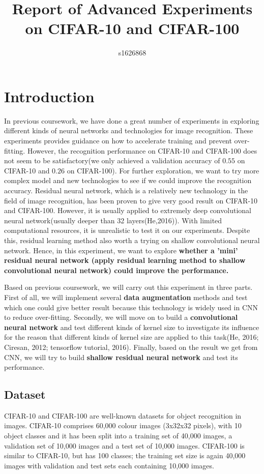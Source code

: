 \documentclass[]{article}
\begin{document}
\title{Report of Advanced Experiments on CIFAR-10 and CIFAR-100}
\author{s1626868}
\maketitle

\section{Introduction}
In previous coursework, we have done a great number of experiments in exploring different kinds of neural networks and technologies for image recognition. These experiments provides guidance on how to accelerate training and prevent over-fitting. However, the recognition performance on CIFAR-10 and CIFAR-100 does not seem to be satisfactory(we only achieved a validation accuracy of $0.55$ on CIFAR-10 and $0.26$ on CIFAR-100). For further exploration, we want to try more complex model and new technologies to see if we could improve the recognition accuracy. Residual neural network, which is a relatively new technology in the field of image recognition, has been proven to give very good result on CIFAR-10 and CIFAR-100. However, it is usually applied to extremely deep convolutional neural network(usually deeper than 32 layers(He,2016)). With limited computational resources, it is unrealistic to test it on our experiments. Despite this, residual learning method also worth a trying on shallow convolutional neural network. Hence, in this experiment, we want to explore \textbf{whether a 'mini' residual neural network (apply residual learning method to shallow convolutional neural network) could improve the performance.}

Based on previous coursework, we will carry out this experiment in three parts. First of all, we will implement several \textbf{data augmentation} methods and test which one could give better result because this technology is widely used in CNN to reduce over-fitting. Secondly, we will move on to build a \textbf{convolutional neural network} and test different kinds of kernel size to investigate its influence for the reason that different kinds of kernel size are applied to this task(He, 2016; Ciresan, 2012; tensorflow tutorial, 2016). Finally, based on the result we get from CNN, we will try to build \textbf{shallow residual neural network} and test its performance.   

\subsection{Dataset}
CIFAR-10 and CIFAR-100 are well-known datasets for object recognition in images. CIFAR-10 comprises 60,000 colour images (3x32x32 pixels), with 10 object classes and it has been split into a training set of 40,000 images, a validation set of 10,000 images and a test set of 10,000 images. CIFAR-100 is similar to CIFAR-10, but has 100 classes; the training set size is again 40,000 images with validation and test sets each containing 10,000 images.
\end{document}
